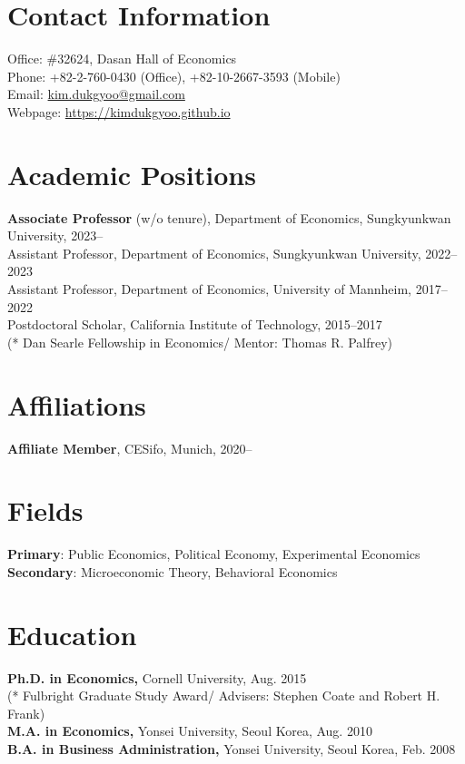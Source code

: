 \documentclass[margin, a4paper]{res}
\begin{document}
 

\begin{resume} 
\section{Contact Information} Office: \#32624, Dasan Hall of Economics\\
Phone: +82-2-760-0430 (Office), +82-10-2667-3593 (Mobile)\\
Email: \href{mailto:kim.dukgyoo@gmail.com}{kim.dukgyoo@gmail.com}\\
Webpage: \url{https://kimdukgyoo.github.io}

\section{Academic Positions}
\textbf{Associate Professor} (w/o tenure), Department of Economics, Sungkyunkwan University, 2023--\\
{Assistant Professor}, Department of Economics, Sungkyunkwan University, 2022--2023\\
{Assistant Professor}, Department of Economics, University of Mannheim, 2017--2022\\
{Postdoctoral Scholar}, California Institute of Technology, 2015--2017\\
(* Dan Searle Fellowship in Economics/ Mentor: Thomas R. Palfrey)

\section{Affiliations}
\textbf{Affiliate Member}, CESifo, Munich, 2020--

\section{Fields}
\textbf{Primary}: Public Economics, Political Economy, Experimental Economics\\
\textbf{Secondary}: Microeconomic Theory, Behavioral Economics

\section{Education} 
\textbf{Ph.D. in Economics,} Cornell University, Aug. 2015\\
(* Fulbright Graduate Study Award/ Advisers: Stephen Coate and Robert H. Frank)\\
\textbf{M.A. in Economics,} Yonsei University, Seoul Korea,  Aug. 2010\\
\textbf{B.A. in Business Administration,} Yonsei University, Seoul Korea, Feb. 2008


\end{resume}
\end{document}

